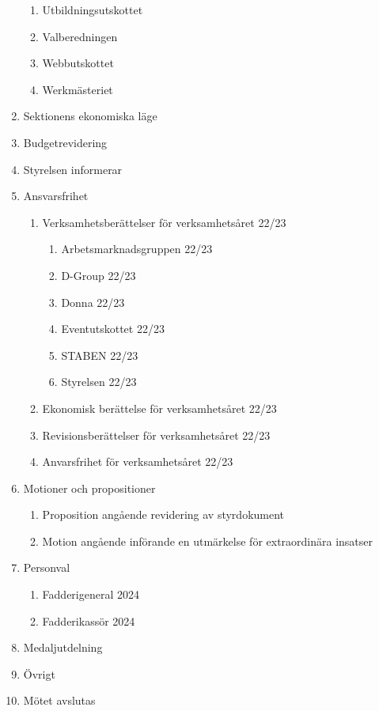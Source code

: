 \documentclass{datateknologsektionen-document}
\begin{document}
\begin{enumerate}[topsep=0pt,itemsep=1ex]
\begin{enumerate}[label*=\arabic*.,leftmargin=3em]
          \item Utbildningsutskottet
          \item Valberedningen
          \item Webbutskottet
          \item Werkmästeriet
        \end{enumerate}
  \item Sektionens ekonomiska läge
  \item Budgetrevidering
  \item Styrelsen informerar
  \item Ansvarsfrihet
        \begin{enumerate}[label*=\arabic*.,leftmargin=3em]
        \item Verksamhetsberättelser för verksamhetsåret 22/23
            \begin{enumerate}[label*=\arabic*.,leftmargin=2em]
                \item Arbetsmarknadsgruppen 22/23
                \item D-Group 22/23 
                \item Donna 22/23
                \item Eventutskottet 22/23 
                \item STABEN 22/23
                \item Styrelsen 22/23 
            \end{enumerate}
          \item Ekonomisk berättelse för verksamhetsåret 22/23
          \item Revisionsberättelser för verksamhetsåret 22/23
          \item Anvarsfrihet för verksamhetsåret 22/23
        \end{enumerate}
  \item Motioner och propositioner
        \begin{enumerate}[label*=\arabic*.,leftmargin=3em]
          \item Proposition angående revidering av styrdokument
          \item Motion angående införande en utmärkelse för extraordinära insatser
        \end{enumerate}
  \item Personval
        \begin{enumerate}[label*=\arabic*.,leftmargin=3em]
          \item Fadderigeneral 2024
          \item Fadderikassör 2024
        \end{enumerate}
  \item Medaljutdelning
  \item Övrigt
  \item Mötet avslutas
\end{enumerate}
\end{document}
